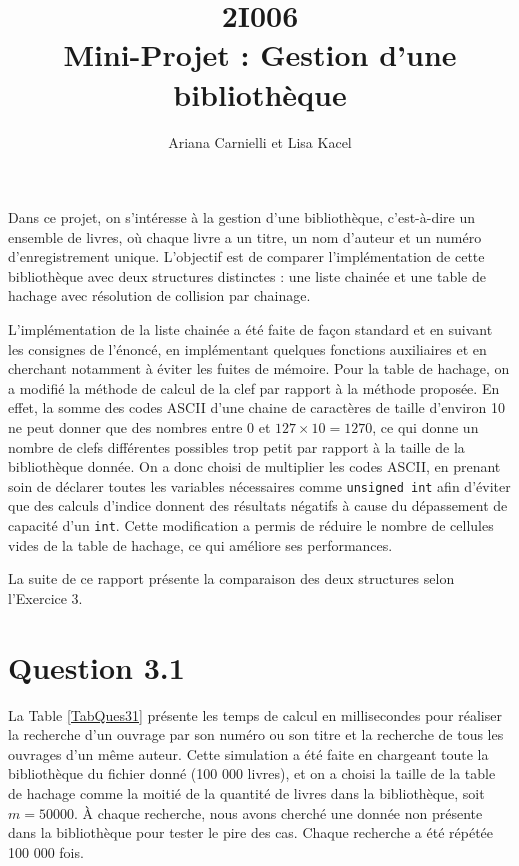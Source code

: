 \documentclass[a4paper,12pt]{article}
\numberwithin{equation}{section}
\begin{document}
\title{2I006 \\ Mini-Projet : Gestion d'une bibliothèque}
\author{Ariana Carnielli et Lisa Kacel}
\date{}

\maketitle

Dans ce projet, on s'intéresse à la gestion d'une bibliothèque, c'est-à-dire un ensemble de livres, où chaque livre a un titre, un nom d'auteur et un numéro d'enregistrement unique. L'objectif est de comparer l'implémentation de cette bibliothèque avec deux structures distinctes : une liste chainée et une table de hachage avec résolution de collision par chainage.

L'implémentation de la liste chainée a été faite de façon standard et en suivant les consignes de l'énoncé, en implémentant quelques fonctions auxiliaires et en cherchant notamment à éviter les fuites de mémoire. Pour la table de hachage, on a modifié la méthode de calcul de la clef par rapport à la méthode proposée. En effet, la somme des codes ASCII d'une chaine de caractères de taille d'environ 10 ne peut donner que des nombres entre 0 et $127 \times 10 = 1270$, ce qui donne un nombre de clefs différentes possibles trop petit par rapport à la taille de la bibliothèque donnée. On a donc choisi de multiplier les codes ASCII, en prenant soin de déclarer toutes les variables nécessaires comme \texttt{unsigned int} afin d'éviter que des calculs d'indice donnent des résultats négatifs à cause du dépassement de capacité d'un \texttt{int}. Cette modification a permis de réduire le nombre de cellules vides de la table de hachage, ce qui améliore ses performances.

La suite de ce rapport présente la comparaison des deux structures selon l'Exercice 3.

\section*{Question 3.1}

La Table \ref{TabQues31} présente les temps de calcul en millisecondes pour réaliser la recherche d'un ouvrage par son numéro ou son titre et la recherche de tous les ouvrages d'un même auteur. Cette simulation a été faite en chargeant toute la bibliothèque du fichier donné (100 000 livres), et on a choisi la taille de la table de hachage comme la moitié de la quantité de livres dans la bibliothèque, soit $m = 50 000$. À chaque recherche, nous avons cherché une donnée non présente dans la bibliothèque pour tester le pire des cas. Chaque recherche a été répétée 100 000 fois.
\end{document}
